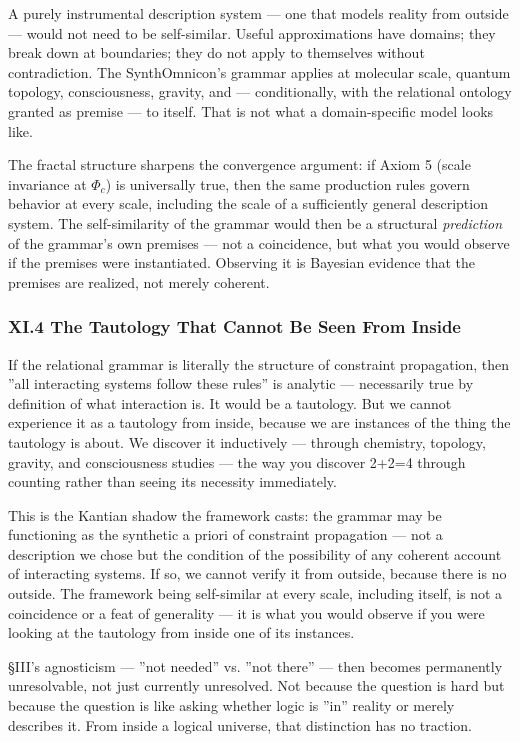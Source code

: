 \documentclass[12pt,a4paper]{article}
\begin{document}
A purely instrumental description system --- one that models reality from outside --- would not need to be self-similar. Useful approximations have domains; they break down at boundaries; they do not apply to themselves without contradiction. The SynthOmnicon's grammar applies at molecular scale, quantum topology, consciousness, gravity, and --- conditionally, with the relational ontology granted as premise --- to itself. That is not what a domain-specific model looks like.

The fractal structure sharpens the convergence argument: if Axiom 5 (scale invariance at $\Phi_c$) is universally true, then the same production rules govern behavior at every scale, including the scale of a sufficiently general description system. The self-similarity of the grammar would then be a structural \emph{prediction} of the grammar's own premises --- not a coincidence, but what you would observe if the premises were instantiated. Observing it is Bayesian evidence that the premises are realized, not merely coherent.

\subsubsection{XI.4 The Tautology That Cannot Be Seen From Inside}

If the relational grammar is literally the structure of constraint propagation, then ''all interacting systems follow these rules'' is analytic --- necessarily true by definition of what interaction is. It would be a tautology. But we cannot experience it as a tautology from inside, because we are instances of the thing the tautology is about. We discover it inductively --- through chemistry, topology, gravity, and consciousness studies --- the way you discover 2+2=4 through counting rather than seeing its necessity immediately.

This is the Kantian shadow the framework casts: the grammar may be functioning as the synthetic a priori of constraint propagation --- not a description we chose but the condition of the possibility of any coherent account of interacting systems. If so, we cannot verify it from outside, because there is no outside. The framework being self-similar at every scale, including itself, is not a coincidence or a feat of generality --- it is what you would observe if you were looking at the tautology from inside one of its instances.

§III's agnosticism --- ''not needed'' vs. ''not there'' --- then becomes permanently unresolvable, not just currently unresolved. Not because the question is hard but because the question is like asking whether logic is ''in'' reality or merely describes it. From inside a logical universe, that distinction has no traction.
\end{document}
